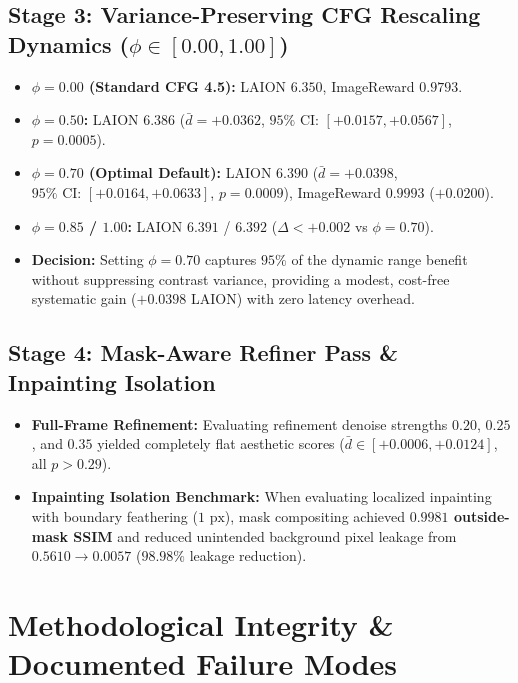 \documentclass[10pt,twocolumn,letterpaper]{article}
\begin{document}
\subsection{\texorpdfstring{Stage 3: Variance-Preserving CFG Rescaling Dynamics ($\phi \in [0.00, 1.00]$)}{Stage 3: Variance-Preserving CFG Rescaling Dynamics (phi in [0.00, 1.00])}}
\begin{itemize}
    \item \textbf{$\phi = 0.00$ (Standard CFG 4.5):} LAION $6.350$, ImageReward $0.9793$.
    \item \textbf{$\phi = 0.50$:} LAION $6.386$ ($\bar{d} = +0.0362$, $95\%\text{ CI: } [+0.0157, +0.0567]$, $p = 0.0005$).
    \item \textbf{$\phi = 0.70$ (Optimal Default):} LAION $6.390$ ($\bar{d} = +0.0398$, $95\%\text{ CI: } [+0.0164, +0.0633]$, $p = 0.0009$), ImageReward $0.9993$ ($+0.0200$).
    \item \textbf{$\phi = 0.85$ / $1.00$:} LAION $6.391$ / $6.392$ ($\Delta < +0.002$ vs $\phi = 0.70$).
    \item \textbf{Decision:} Setting $\phi = 0.70$ captures $95\%$ of the dynamic range benefit without suppressing contrast variance, providing a modest, cost-free systematic gain ($+0.0398$ LAION) with zero latency overhead.
\end{itemize}

\subsection{Stage 4: Mask-Aware Refiner Pass \& Inpainting Isolation}
\begin{itemize}
    \item \textbf{Full-Frame Refinement:} Evaluating refinement denoise strengths $0.20$, $0.25$, and $0.35$ yielded completely flat aesthetic scores ($\bar{d} \in [+0.0006, +0.0124]$, all $p > 0.29$).
    \item \textbf{Inpainting Isolation Benchmark:} When evaluating localized inpainting with boundary feathering ($1\text{ px}$), mask compositing achieved \textbf{$0.9981$ outside-mask SSIM} and reduced unintended background pixel leakage from $0.5610 \to 0.0057$ ($98.98\%$ leakage reduction).
\end{itemize}

\section{Methodological Integrity \& Documented Failure Modes}
\end{document}
